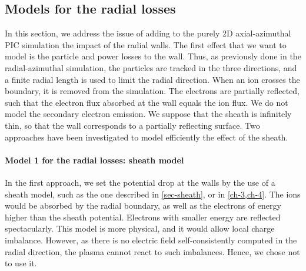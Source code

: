\subsection{Models for the radial losses} \label{subsec-fakeR}

In this section, we address the issue of adding to the purely \ac{2D} axial-azimuthal \ac{PIC} simulation the impact of the radial walls.
The first effect that we want to model is the particle and power losses to the wall.
Thus, as previously done in the radial-azimuthal simulation, the particles are tracked in the three directions, and a finite radial length is used to limit the radial direction.
When an ion crosses the boundary, it is removed from the simulation.
The electrons are partially reflected, such that the electron flux absorbed at the wall equals the ion flux.
We do not model the secondary electron emission.
We suppose that the sheath is infinitely thin, so that the wall corresponds to a partially reflecting surface.
Two approaches have been investigated to model efficiently the effect of the sheath.


\paragraph{ Model 1 for the radial losses\string: sheath model\\}
In the first approach, we set the potential drop at the walls by the use of a sheath model, such as the one described in \cref{sec-sheath}, or in \cref{ch-3,ch-4}.
The ions would be absorbed by the radial boundary, as well as the electrons of energy higher than the sheath potential.
Electrons with smaller energy are reflected spectacularly.
This model is more physical, and it would allow local charge imbalance.
However, as there is no electric field self-consistently computed in the radial direction, the plasma cannot react to such imbalances.
Hence, we chose not to use it.


